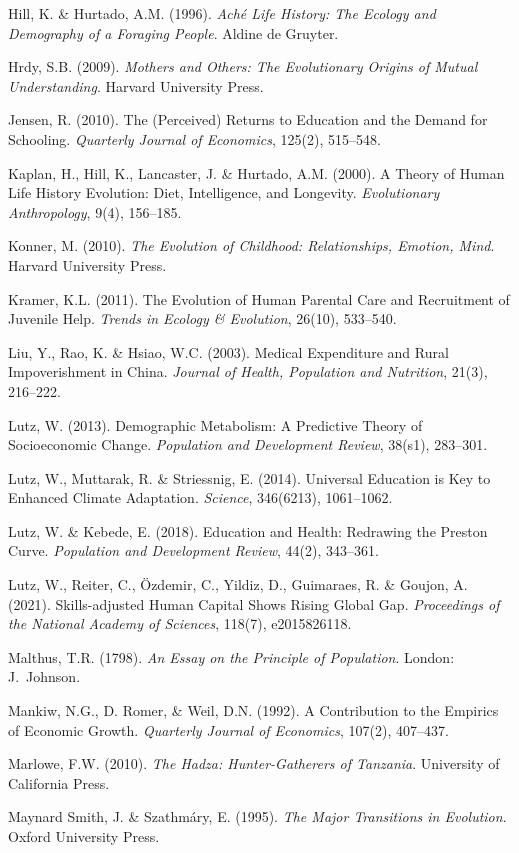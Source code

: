 \documentclass[12pt,letterpaper]{article}
\begin{document}
Hill, K. \& Hurtado, A.M. (1996). \emph{Aché Life History: The Ecology
and Demography of a Foraging People}. Aldine de Gruyter.

Hrdy, S.B. (2009). \emph{Mothers and Others: The Evolutionary Origins
of Mutual Understanding}. Harvard University Press.

Jensen, R. (2010). The (Perceived) Returns to Education and the Demand
for Schooling. \emph{Quarterly Journal of Economics}, 125(2), 515--548.

Kaplan, H., Hill, K., Lancaster, J. \& Hurtado, A.M. (2000). A Theory
of Human Life History Evolution: Diet, Intelligence, and Longevity.
\emph{Evolutionary Anthropology}, 9(4), 156--185.

Konner, M. (2010). \emph{The Evolution of Childhood: Relationships,
Emotion, Mind}. Harvard University Press.

Kramer, K.L. (2011). The Evolution of Human Parental Care and
Recruitment of Juvenile Help. \emph{Trends in Ecology \& Evolution},
26(10), 533--540.

Liu, Y., Rao, K. \& Hsiao, W.C. (2003). Medical Expenditure and Rural
Impoverishment in China. \emph{Journal of Health, Population and
Nutrition}, 21(3), 216--222.

Lutz, W. (2013). Demographic Metabolism: A Predictive Theory of
Socioeconomic Change. \emph{Population and Development Review},
38(s1), 283--301.

Lutz, W., Muttarak, R. \& Striessnig, E. (2014). Universal Education
is Key to Enhanced Climate Adaptation. \emph{Science}, 346(6213),
1061--1062.

Lutz, W. \& Kebede, E. (2018). Education and Health: Redrawing the
Preston Curve. \emph{Population and Development Review}, 44(2),
343--361.

Lutz, W., Reiter, C., Özdemir, C., Yildiz, D., Guimaraes, R. \& Goujon,
A. (2021). Skills-adjusted Human Capital Shows Rising Global Gap.
\emph{Proceedings of the National Academy of Sciences}, 118(7),
e2015826118.

Malthus, T.R. (1798). \emph{An Essay on the Principle of Population}.
London: J.~Johnson.

Mankiw, N.G., D. Romer, \& Weil, D.N. (1992). A Contribution to the
Empirics of Economic Growth. \emph{Quarterly Journal of Economics},
107(2), 407--437.

Marlowe, F.W. (2010). \emph{The Hadza: Hunter-Gatherers of Tanzania}.
University of California Press.

Maynard Smith, J. \& Szathmáry, E. (1995). \emph{The Major Transitions
in Evolution}. Oxford University Press.
\end{document}
